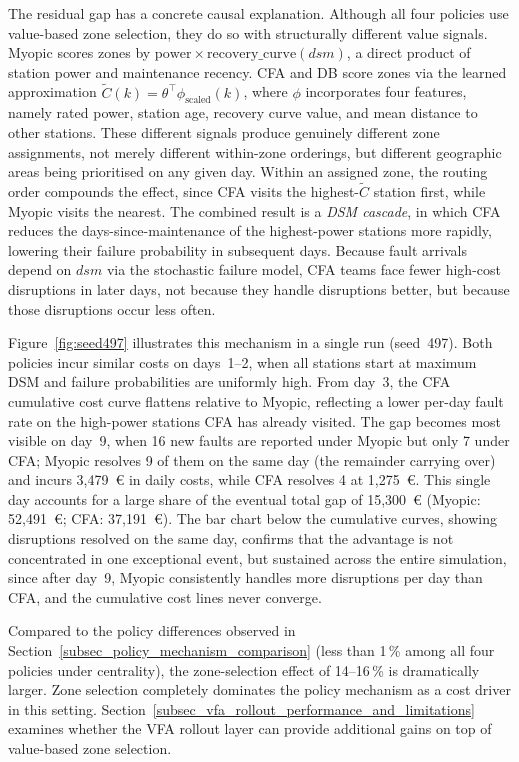 \documentclass[12pt,oneside]{article}
\begin{document}
The residual gap has a concrete causal explanation. Although all four policies use value-based zone selection, they do so with structurally different value signals. Myopic scores zones by $\text{power} \times \text{recovery\_curve}(\mathit{dsm})$, a direct product of station power and maintenance recency. CFA and DB score zones via the learned approximation $\tilde{C}(k) = \theta^\top \phi_{\text{scaled}}(k)$, where $\phi$ incorporates four features, namely rated power, station age, recovery curve value, and mean distance to other stations. These different signals produce genuinely different zone assignments, not merely different within-zone orderings, but different geographic areas being prioritised on any given day. Within an assigned zone, the routing order compounds the effect, since CFA visits the highest-$\tilde{C}$ station first, while Myopic visits the nearest. The combined result is a \emph{DSM cascade}, in which CFA reduces the days-since-maintenance of the highest-power stations more rapidly, lowering their failure probability in subsequent days. Because fault arrivals depend on $\mathit{dsm}$ via the stochastic failure model, CFA teams face fewer high-cost disruptions in later days, not because they handle disruptions better, but because those disruptions occur less often.

Figure~\ref{fig:seed497} illustrates this mechanism in a single run (seed~497). Both policies incur similar costs on days~1--2, when all stations start at maximum DSM and failure probabilities are uniformly high. From day~3, the CFA cumulative cost curve flattens relative to Myopic, reflecting a lower per-day fault rate on the high-power stations CFA has already visited. The gap becomes most visible on day~9, when 16 new faults are reported under Myopic but only 7 under CFA; Myopic resolves 9 of them on the same day (the remainder carrying over) and incurs 3{,}479~€ in daily costs, while CFA resolves 4 at 1{,}275~€. This single day accounts for a large share of the eventual total gap of 15{,}300~€ (Myopic: 52{,}491~€; CFA: 37{,}191~€). The bar chart below the cumulative curves, showing disruptions resolved on the same day, confirms that the advantage is not concentrated in one exceptional event, but sustained across the entire simulation, since after day~9, Myopic consistently handles more disruptions per day than CFA, and the cumulative cost lines never converge.

Compared to the policy differences observed in Section~\ref{subsec_policy_mechanism_comparison} (less than 1\,\% among all four policies under centrality), the zone-selection effect of 14--16\,\% is dramatically larger. Zone selection completely dominates the policy mechanism as a cost driver in this setting. Section~\ref{subsec_vfa_rollout_performance_and_limitations} examines whether the VFA rollout layer can provide additional gains on top of value-based zone selection.
\end{document}
